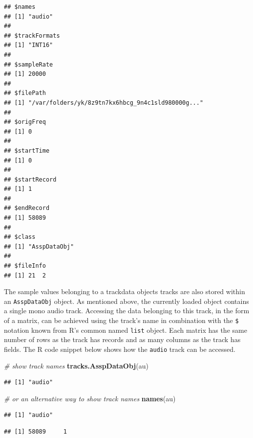 \documentclass[]{book}
\newenvironment{Shaded}{\begin{snugshade}}{\end{snugshade}}
\newcommand{\CommentTok}[1]{\textcolor[rgb]{0.56,0.35,0.01}{\textit{#1}}}
\newcommand{\KeywordTok}[1]{\textcolor[rgb]{0.13,0.29,0.53}{\textbf{#1}}}
\newcommand{\NormalTok}[1]{#1}
\newcommand{\OperatorTok}[1]{\textcolor[rgb]{0.81,0.36,0.00}{\textbf{#1}}}
\begin{document}
\begin{verbatim}
## $names
## [1] "audio"
## 
## $trackFormats
## [1] "INT16"
## 
## $sampleRate
## [1] 20000
## 
## $filePath
## [1] "/var/folders/yk/8z9tn7kx6hbcg_9n4c1sld980000g..."
## 
## $origFreq
## [1] 0
## 
## $startTime
## [1] 0
## 
## $startRecord
## [1] 1
## 
## $endRecord
## [1] 58089
## 
## $class
## [1] "AsspDataObj"
## 
## $fileInfo
## [1] 21  2
\end{verbatim}

The sample values belonging to a trackdata objects tracks are also stored within an \texttt{AsspDataObj} object. As mentioned above, the currently loaded object contains a single mono audio track. Accessing the data belonging to this track, in the form of a matrix, can be achieved using the track's name in combination with the \texttt{\$} notation known from R's common named \texttt{list} object. Each matrix has the same number of rows as the track has records and as many columns as the track has fields. The R code snippet below shows how the \texttt{audio} track can be accessed.

\begin{Shaded}
\begin{Highlighting}[]
\CommentTok{# show track names}
\KeywordTok{tracks.AsspDataObj}\NormalTok{(au)}
\end{Highlighting}
\end{Shaded}

\begin{verbatim}
## [1] "audio"
\end{verbatim}

\begin{Shaded}
\begin{Highlighting}[]
\CommentTok{# or an alternative way to show track names}
\KeywordTok{names}\NormalTok{(au)}
\end{Highlighting}
\end{Shaded}

\begin{verbatim}
## [1] "audio"
\end{verbatim}

\begin{Shaded}
\end{Shaded}

\begin{verbatim}
## [1] 58089     1
\end{verbatim}
\end{document}
